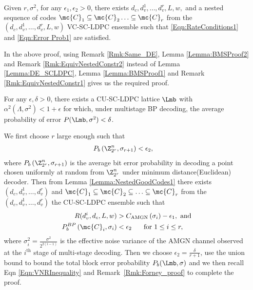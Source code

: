 \documentclass[journal]{IEEEtran}
\begin{document}
\begin{lemma}\label{Lemma:NestedGoodCodes2}
Given $r,\sigma^{2}$, for any $\epsilon_{1},\epsilon_{2}>0$, there exists $d_{c},d_{v}^{1},\ldots, d_{v}^{r},L,w,$ and a nested sequence of codes $\mc{C}_{1}\subseteq \mc{C}_{2}\ldots \subseteq\mc{C}_{r}$ from the $(d_{c},d_{v}^{1},\ldots,d_{v}^{r},L,w)$ VC-SC-LDPC ensemble such that \eqref{Eqn:RateConditions1} and \eqref{Eqn:Error Prob1} are satisfied.
\end{lemma}

\begin{IEEEproof}
In the above proof, using Remark \ref{Rmk:Same_DE}, Lemma \ref{Lemma:BMSProof2} and Remark \ref{Rmk:EquivNestedConstr2}  instead of  Lemma \ref{Lemma:DE_SCLDPC}, Lemma \ref{Lemma:BMSProof1} and Remark \ref{Rmk:EquivNestedConstr1} gives us the required proof.

\end{IEEEproof}

\begin{theorem}\label{Thm:Poltyrev_good}
   For any $\epsilon,\delta>0$, there exists a CU-SC-LDPC lattice $\Lmb$ with $\alpha^2(\Lambda,\sigma^2)<1+\epsilon$ for which, under multistage BP decoding, the average probability of error $P(\Lmb,\sigma^{2})<\delta$.
\end{theorem}
\begin{IEEEproof}
We first choose $r$ large enough such that 
\begin{align*}
P_{b}\left(\Z_{2^{r}}^{n},\sigma_{r+1}\right)&<\epsilon_{2} ,
\end{align*}
where $P_{b}\left(\Z_{2^{r}}^{n},\sigma_{r+1}\right)$ is the average bit error probability in decoding a point chosen uniformly at random from $\Z_{2^{r}}^{n}$ under minimum distance(Euclidean) decoder. 
Then from Lemma \ref{Lemma:NestedGoodCodes1} there exists $(d_{c},d_{v}^{1},\ldots,d_{v}^{r})$ and $\mc{C}_{1}\subseteq \mc{C}_{2}\subseteq \ldots \subseteq \mc{C}_{r}$ from the $(d_{c},d_{v}^{1},\ldots,d_{v}^{r})$ the CU-SC-LDPC ensemble such that 
\begin{align}
R(d_{v}^{i},d_{c},L,w)&>C_{\text{AMGN}}\left(\sigma_{i}\right)-\epsilon_{1}, \text{ and} \\
P_{b}^{BP}\left(\mc{C}_{i},\sigma_{i}\right)&<\epsilon_{2} \hspace{0.5cm}\text{ for }1\leq i \leq r,
\end{align}
where $\sigma_{i}^{2}=\frac{\sigma^{2}}{2^{2(i-1)}}$ is the effective noise variance of the AMGN channel observed at the $i^{\text{th}}$ stage of multi-stage decoding. Then we choose $\epsilon_{2}=\frac{\delta}{r+1}$, use the union bound to bound the total block error probability $P_{b}(\Lmb,\sigma)$ and we then recall  Eqn \eqref{Eqn:VNRInequality} and Remark~\ref{Rmk:Forney_proof} to complete the proof.
\end{IEEEproof}
\end{document}
